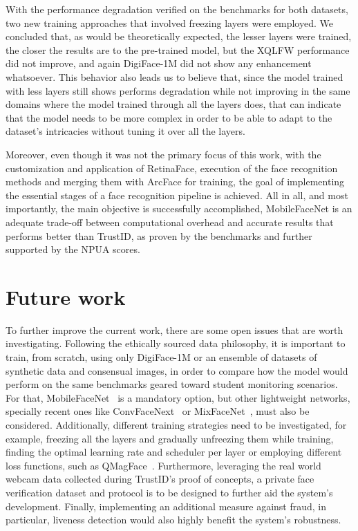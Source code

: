 \documentclass[class=report, crop=false, a4paper, 12pt]{standalone}
\begin{document}
\par With the performance degradation verified on the benchmarks for both datasets, two new training approaches that involved freezing layers were employed. We concluded that, as would be theoretically expected, the lesser layers were trained, the closer the results are to the pre-trained model, but the XQLFW performance did not improve, and again DigiFace-1M did not show any enhancement whatsoever. This behavior also leads us to believe that, since the model trained with less layers still shows performs degradation while not improving in the same domains where the model trained through all the layers does, that can indicate that the model needs to be more complex in order to be able to adapt to the dataset's intricacies without tuning it over all the layers.

\par Moreover, even though it was not the primary focus of this work, with the customization and application of RetinaFace, execution of the face recognition methods and merging them with ArcFace for training, the goal of implementing the essential stages of a face recognition pipeline is achieved. All in all, and most importantly, the main objective is successfully accomplished, MobileFaceNet is an adequate trade-off between computational overhead and accurate results that performs better than TrustID, as proven by the benchmarks and further supported by the NPUA scores.

\section{Future work}
To further improve the current work, there are some open issues that are worth investigating. Following the ethically sourced data philosophy, it is important to train, from scratch, using only DigiFace-1M or an ensemble of datasets of synthetic data and consensual images, in order to compare how the model would perform on the same benchmarks geared toward student monitoring scenarios. For that, MobileFaceNet~\autocite{chenMobileFaceNetsEfficientCNNs2018} is a mandatory option, but other lightweight networks, specially recent ones like ConvFaceNext~\autocite{hooConvFaceNeXtLightweightNetworks2022} or MixFaceNet~\autocite{boutrosMixFaceNetsExtremelyEfficient2021}, must also be considered. Additionally, different training strategies need to be investigated, for example, freezing all the layers and gradually unfreezing them while training, finding the optimal learning rate and scheduler per layer or employing different loss functions, such as QMagFace~\autocite{terhorstQMagFaceSimpleAccurate2023}. Furthermore, leveraging the real world webcam data collected during TrustID's proof of concepts, a private face verification dataset and protocol is to be designed to further aid the system's development. Finally, implementing an additional measure against fraud, in particular, liveness detection would also highly benefit the system's robustness. 
\end{document}

